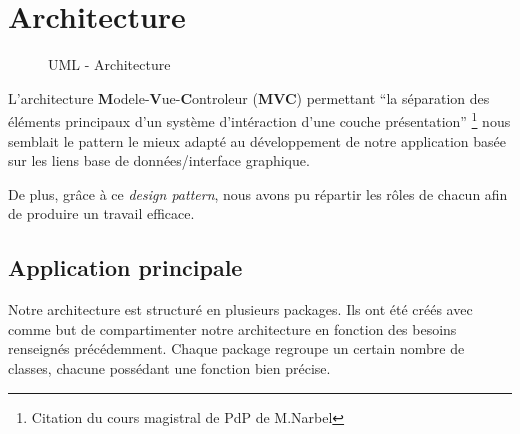 \chapter{Architecture}
 
\begin{figure}[!h]
\begin{center}
  \caption{UML - Architecture}
  \label{archi} 
\end{center}
\end{figure}

L'architecture \textbf{M}odele-\textbf{V}ue-\textbf{C}ontroleur (\textbf{MVC}) permettant ``la séparation des éléments principaux d'un système d'intéraction d'une couche présentation'' \footnote{Citation du cours magistral de PdP de M.Narbel} nous semblait le pattern le mieux adapté au développement de notre application basée sur les liens base de données/interface graphique. 

De plus, grâce à ce \textit{design pattern}, nous avons pu répartir les rôles de chacun afin de produire un travail efficace.

\section{Application principale}

Notre architecture est structuré en plusieurs packages. Ils ont été créés avec comme but de compartimenter notre architecture en fonction des besoins renseignés précédemment. Chaque package regroupe un certain nombre de classes, chacune possédant une fonction bien précise.

